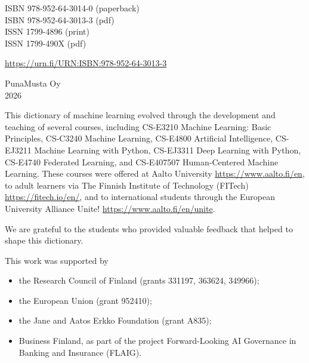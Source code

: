 \documentclass[journal,12pt,onecolumn]{article}
\begin{document}
\vspace{10mm}

\noindent
ISBN 978-952-64-3014-0 (paperback)\\
ISBN 978-952-64-3013-3 (pdf)\\[2mm]
ISSN 1799-4896 (print)\\
ISSN 1799-490X (pdf)

\vspace{5mm}

\noindent
\url{https://urn.fi/URN:ISBN:978-952-64-3013-3}

\vfill

\noindent
PunaMusta Oy\\
2026

\newpage 
{} %

\noindent This dictionary of machine learning evolved through the development 
and teaching of several courses, including CS-E3210 Machine Learning: Basic Principles, 
CS-C3240 Machine Learning, CS-E4800 Artificial Intelligence, CS-EJ3211 Machine Learning with Python, 
CS-EJ3311 Deep Learning with Python, CS-E4740 Federated Learning, and 
CS-E407507 Human-Centered Machine Learning. These courses were offered at 
Aalto University \url{https://www.aalto.fi/en}, to adult learners via 
The Finnish Institute of Technology (FITech) \url{https://fitech.io/en/}, and to international 
students through the European University Alliance Unite! \url{https://www.aalto.fi/en/unite}.

\noindent We are grateful to the students who provided valuable feedback that helped 
to shape this dictionary. %

\noindent This work was supported by
\begin{itemize} 
	\item the Research Council of Finland (grants 331197, 363624, 349966);
	\item the European Union (grant 952410);
	\item the Jane and Aatos Erkko Foundation (grant A835); 
	\item Business Finland, as part of the project Forward-Looking AI Governance in Banking and Insurance (FLAIG).
\end{itemize} 
\end{document}
